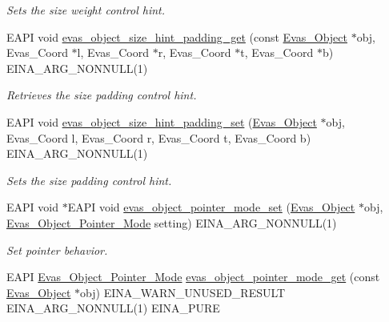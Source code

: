 \begin{DoxyCompactItemize}
\begin{DoxyCompactList}\small\item\em Sets the size weight control hint. \item\end{DoxyCompactList}\item 
EAPI void \hyperlink{group__Evas__Object__Group__Size__Hints_ga81b821793f451c648052cf7d6cfe6dd4}{evas\_\-object\_\-size\_\-hint\_\-padding\_\-get} (const \hyperlink{group__Evas__Object__Group_ga9e19e6dd1f517a0ba437c0114d3e7c97}{Evas\_\-Object} $\ast$obj, Evas\_\-Coord $\ast$l, Evas\_\-Coord $\ast$r, Evas\_\-Coord $\ast$t, Evas\_\-Coord $\ast$b) EINA\_\-ARG\_\-NONNULL(1)
\begin{DoxyCompactList}\small\item\em Retrieves the size padding control hint. \item\end{DoxyCompactList}\item 
EAPI void \hyperlink{group__Evas__Object__Group__Size__Hints_ga0014a3016d34071d41d76785a963fcb1}{evas\_\-object\_\-size\_\-hint\_\-padding\_\-set} (\hyperlink{group__Evas__Object__Group_ga9e19e6dd1f517a0ba437c0114d3e7c97}{Evas\_\-Object} $\ast$obj, Evas\_\-Coord l, Evas\_\-Coord r, Evas\_\-Coord t, Evas\_\-Coord b) EINA\_\-ARG\_\-NONNULL(1)
\begin{DoxyCompactList}\small\item\em Sets the size padding control hint. \item\end{DoxyCompactList}\item 
EAPI void $\ast$EAPI void \hyperlink{group__Evas__Object__Group__Extras_ga5504e39f8d0cc41af3663fed15ec06e5}{evas\_\-object\_\-pointer\_\-mode\_\-set} (\hyperlink{group__Evas__Object__Group_ga9e19e6dd1f517a0ba437c0114d3e7c97}{Evas\_\-Object} $\ast$obj, \hyperlink{group__Evas__Object__Group__Extras_ga27baac4c63b590de109e3e3f0d941483}{Evas\_\-Object\_\-Pointer\_\-Mode} setting) EINA\_\-ARG\_\-NONNULL(1)
\begin{DoxyCompactList}\small\item\em Set pointer behavior. \item\end{DoxyCompactList}\item 
EAPI \hyperlink{group__Evas__Object__Group__Extras_ga27baac4c63b590de109e3e3f0d941483}{Evas\_\-Object\_\-Pointer\_\-Mode} \hyperlink{group__Evas__Object__Group__Extras_ga80faa9ce3b9ab59fe7b4bf6924b293ac}{evas\_\-object\_\-pointer\_\-mode\_\-get} (const \hyperlink{group__Evas__Object__Group_ga9e19e6dd1f517a0ba437c0114d3e7c97}{Evas\_\-Object} $\ast$obj) EINA\_\-WARN\_\-UNUSED\_\-RESULT EINA\_\-ARG\_\-NONNULL(1) EINA\_\-PURE

\end{DoxyCompactItemize}

